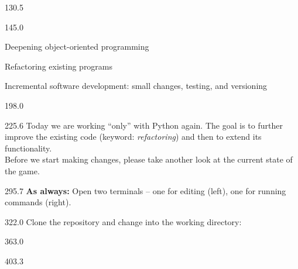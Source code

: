 \documentclass{aslab}
\begin{document}
\maketitleblock

\begin{region}{130.5}
\end{region}

\begin{region}[pitch=13]{145.0}
{\color{aslabblue}\bfseries
\begin{dashlist}
\item Deepening object-oriented programming
\item Refactoring existing programs
\item Incremental software development: small changes, testing, and versioning
\end{dashlist}\par}
\end{region}

\begin{region}{198.0}
\end{region}

\begin{region}[pitch=13.87]{225.6}
Today we are working ``only'' with Python again. The goal is to further
improve the existing code (keyword: \emph{refactoring}) and then to extend its
functionality.\\
Before we start making changes, please take another look at the current
state of the game.
\end{region}

\begin{region}{295.7}
\textbf{As always:} Open two terminals -- one for editing (left), one for
running commands (right).
\end{region}

\begin{region}[pitch=13.3]{322.0}
Clone the repository and change into the working directory:
\end{region}

\begin{region}[pitch=13.2]{363.0}
\\
\end{region}

\begin{region}{403.3}
\end{region}
\end{document}
